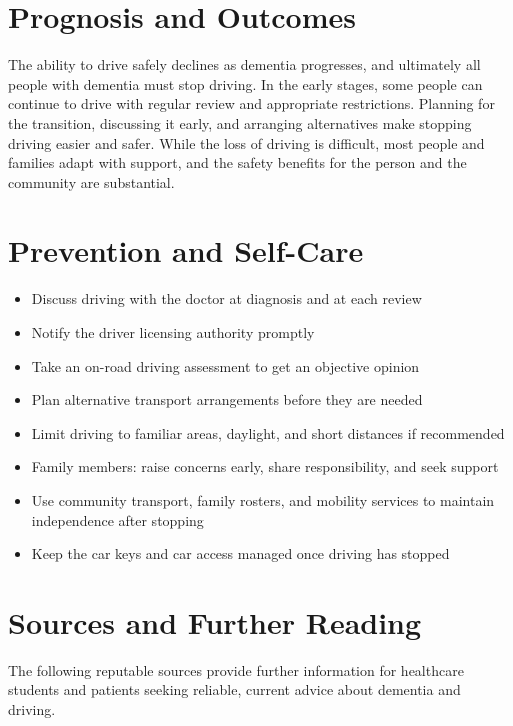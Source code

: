 \section*{Prognosis and Outcomes}
The ability to drive safely declines as dementia progresses, and ultimately all people with dementia must stop driving. In the early stages, some people can continue to drive with regular review and appropriate restrictions. Planning for the transition, discussing it early, and arranging alternatives make stopping driving easier and safer. While the loss of driving is difficult, most people and families adapt with support, and the safety benefits for the person and the community are substantial.

\section*{Prevention and Self-Care}
\begin{itemize}
    \item Discuss driving with the doctor at diagnosis and at each review
    \item Notify the driver licensing authority promptly
    \item Take an on-road driving assessment to get an objective opinion
    \item Plan alternative transport arrangements before they are needed
    \item Limit driving to familiar areas, daylight, and short distances if recommended
    \item Family members: raise concerns early, share responsibility, and seek support
    \item Use community transport, family rosters, and mobility services to maintain independence after stopping
    \item Keep the car keys and car access managed once driving has stopped
\end{itemize}

\section*{Sources and Further Reading}
The following reputable sources provide further information for healthcare students and patients seeking reliable, current advice about dementia and driving.

